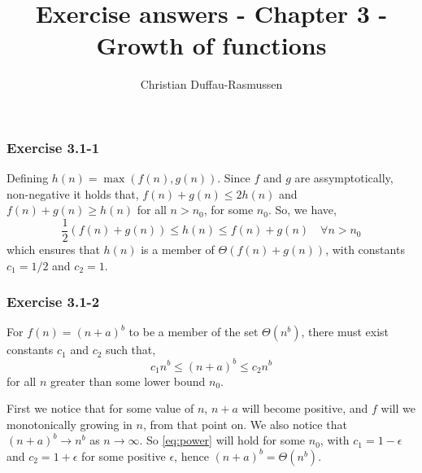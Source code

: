\documentclass{article}
\title{Exercise answers - Chapter 3 - Growth of functions}
\author{Christian Duffau-Rasmussen}
\begin{document}
\maketitle

\subsubsection*{Exercise 3.1-1}

Defining $h(n) = \max(f(n), g(n))$. Since $f$ and $g$ are assymptotically, non-negative it holds that, $f(n)+ g(n) \leq 2h(n)$ and $f(n) + g(n)\geq h(n)$ for all $n>n_0$, for some $n_0$. So, we have,
\[
\frac{1}{2}(f(n) + g(n)) \leq h(n) \leq f(n) + g(n)\quad\forall n>n_0
\]
which ensures that $h(n)$ is a member of $\Theta(f(n) + g(n))$, with constants $c_1=1/2$ and $c_2=1$. 

\subsubsection*{Exercise 3.1-2}

For $f(n)=(n+a)^b$ to be a member of the set $\Theta(n^b)$, there must exist constants $c_1$ and $c_2$ such that,
\begin{equation} \label{eq:power}
c_1n^b \leq (n+a)^b \leq c_2n^b 
\end{equation} 
for all $n$ greater than some lower bound $n_0$.

First we notice that for some value of $n$, $n+a$ will become positive, and $f$ will we monotonically growing in $n$, from that point on.
We also notice that $(n+a)^b\rightarrow n^b$ as $n\rightarrow\infty$. So \eqref{eq:power} will hold for some $n_0$, with $c_1=1-\epsilon$ and $c_2=1+\epsilon$ for some positive $\epsilon$, hence $(n+a)^b=\Theta(n^b)$.
\end{document}
